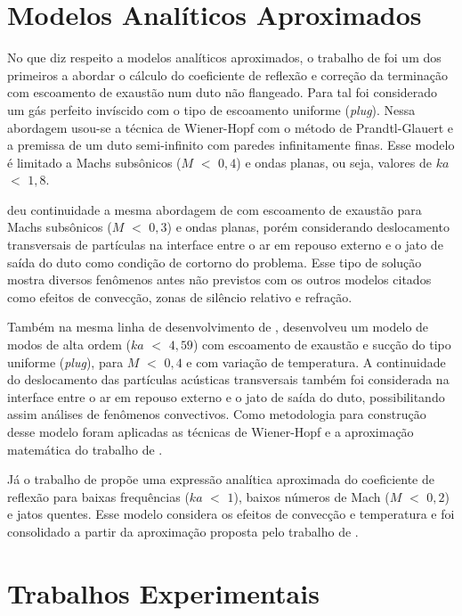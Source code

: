 \section{Modelos Analíticos Aproximados}

No que diz respeito a modelos analíticos aproximados, o trabalho de  foi um dos primeiros a abordar o cálculo do coeficiente de reflexão e correção da terminação com escoamento de exaustão num duto não flangeado. Para tal foi considerado um gás perfeito invíscido com o tipo de escoamento uniforme (\textit{plug}). Nessa abordagem usou-se a técnica de Wiener-Hopf com o método de Prandtl-Glauert e a premissa de um duto semi-infinito com paredes infinitamente finas. Esse modelo é limitado a Machs subsônicos ($M$ $<$ $0,4$) e ondas planas, ou seja, valores de $ka$ $<$ $1,8$.

 deu continuidade a mesma abordagem de  com escoamento de exaustão para Machs subsônicos ($M$ $<$ $0,3$) e ondas planas, porém considerando deslocamento transversais de partículas na interface entre o ar em repouso externo e o jato de saída do duto como condição de cortorno do problema. Esse tipo de solução mostra diversos fenômenos antes não previstos com os outros modelos citados como efeitos de convecção, zonas de silêncio relativo e refração.

Também na mesma linha de desenvolvimento de ,  desenvolveu um modelo de modos de alta ordem ($ka$ $<$ $4,59$) com escoamento de exaustão e sucção do tipo uniforme (\textit{plug}), para $M$ $<$ $0,4$ e com variação de temperatura. A continuidade do deslocamento das partículas acústicas transversais também foi considerada na interface entre o ar em repouso externo e o jato de saída do duto, possibilitando assim análises de fenômenos convectivos. Como metodologia para construção desse modelo foram aplicadas as técnicas de Wiener-Hopf e a aproximação matemática do trabalho de .

Já o trabalho de  propõe uma expressão analítica aproximada do coeficiente de reflexão para baixas frequências ($ka$ $<$ $1$), baixos números de Mach ($M$ $<$ $0,2$) e jatos quentes. Esse modelo considera os efeitos de convecção e temperatura e foi consolidado a partir da aproximação proposta pelo trabalho de .   

\section{Trabalhos Experimentais}

